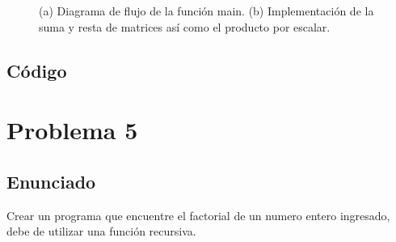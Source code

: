 \begin{figure}[H]
\caption{(a) Diagrama de flujo de la función main. (b) Implementación de la suma y resta de matrices así como el producto por escalar.}
\label{FDp4}
\end{figure}

\subsection{Código}


\section{Problema 5}
\subsection{Enunciado}
Crear un programa que encuentre el factorial de un numero entero ingresado, debe de utilizar una
función recursiva.


